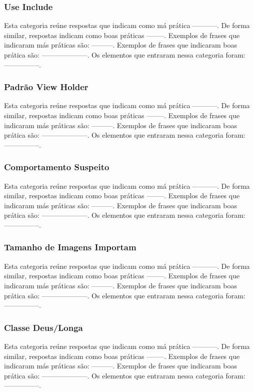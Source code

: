 \subsubsection{Use Include}
Esta categoria re\'une respostas que indicam como m\'a pr\'atica -----------. De forma similar, respostas indicam como boas pr\'aticas --------. Exemplos de frases que indicaram m\'as pr\'aticas s\~ao: ---------. Exemplos de frases que indicaram boas pr\'atica s\~ao: --------------------. Os elementos que entraram nessa categoria foram: ---------------. 

\subsubsection{Padrão View Holder}
Esta categoria re\'une respostas que indicam como m\'a pr\'atica -----------. De forma similar, respostas indicam como boas pr\'aticas --------. Exemplos de frases que indicaram m\'as pr\'aticas s\~ao: ---------. Exemplos de frases que indicaram boas pr\'atica s\~ao: --------------------. Os elementos que entraram nessa categoria foram: ---------------. 

\subsubsection{Comportamento Suspeito}
Esta categoria re\'une respostas que indicam como m\'a pr\'atica -----------. De forma similar, respostas indicam como boas pr\'aticas --------. Exemplos de frases que indicaram m\'as pr\'aticas s\~ao: ---------. Exemplos de frases que indicaram boas pr\'atica s\~ao: --------------------. Os elementos que entraram nessa categoria foram: ---------------. 

\subsubsection{Tamanho de Imagens Importam}
Esta categoria re\'une respostas que indicam como m\'a pr\'atica -----------. De forma similar, respostas indicam como boas pr\'aticas --------. Exemplos de frases que indicaram m\'as pr\'aticas s\~ao: ---------. Exemplos de frases que indicaram boas pr\'atica s\~ao: --------------------. Os elementos que entraram nessa categoria foram: ---------------. 

\subsubsection{Classe Deus/Longa}
Esta categoria re\'une respostas que indicam como m\'a pr\'atica -----------. De forma similar, respostas indicam como boas pr\'aticas --------. Exemplos de frases que indicaram m\'as pr\'aticas s\~ao: ---------. Exemplos de frases que indicaram boas pr\'atica s\~ao: --------------------. Os elementos que entraram nessa categoria foram: ---------------. 

